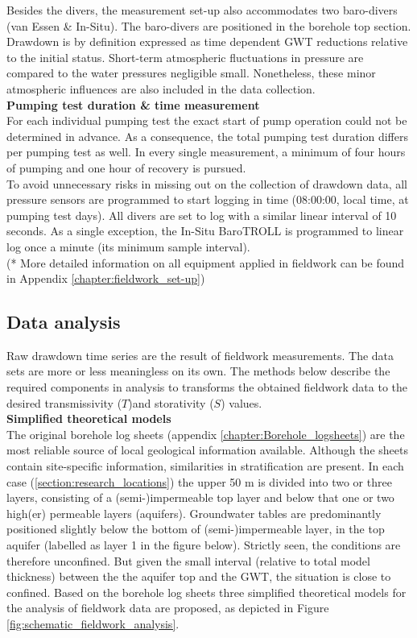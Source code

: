 Besides the divers, the measurement set-up also accommodates two baro-divers (van Essen \& In-Situ). The baro-divers are positioned in the borehole top section. Drawdown is by definition expressed as time dependent GWT reductions relative to the initial status. Short-term atmospheric fluctuations in pressure are compared to the water pressures negligible small. Nonetheless, these minor atmospheric influences are also included in the data collection. 
\bigskip \\
\textbf{Pumping test duration \& time measurement} \\
For each individual pumping test the exact start of pump operation could not be determined in advance. As a consequence, the total pumping test duration differs per pumping test as well. In every single measurement, a minimum of four hours of pumping and one hour of recovery is pursued. \\
To avoid unnecessary risks in missing out on the collection of drawdown data, all pressure sensors are programmed to start logging in time (08:00:00, local time, at pumping test days). All divers are set to log with a similar linear interval of 10 seconds. As a single exception, the In-Situ BaroTROLL is programmed to linear log once a minute (its minimum sample interval). \\

(* More detailed information on all equipment applied in fieldwork can be found in Appendix \ref{chapter:fieldwork_set-up}) 

\subsection{Data analysis}
\label{subsection:derivation_methods}
Raw drawdown time series are the result of fieldwork measurements. The data sets are more or less meaningless on its own. The methods below describe the required components in analysis to transforms the obtained fieldwork data to the desired transmissivity ($T$)and storativity ($S$) values. \\

\textbf{Simplified theoretical models} \\
The original borehole log sheets (appendix \ref{chapter:Borehole_logsheets}) are the most reliable source of local geological information available. Although the sheets contain site-specific information, similarities in stratification are present. In each case (\ref{section:research_locations}) the upper 50 m is divided into two or three layers, consisting of a (semi-)impermeable top layer and below that one or two high(er) permeable layers (aquifers). Groundwater tables are predominantly positioned slightly below the bottom of (semi-)impermeable layer, in the top aquifer (labelled as layer 1 in the figure below). Strictly seen, the conditions are therefore unconfined. But given the small interval (relative to total model thickness) between the the aquifer top and the GWT, the situation is close to confined. Based on the borehole log sheets three simplified theoretical models for the analysis of fieldwork data are proposed, as depicted in Figure \ref{fig:schematic_fieldwork_analysis}. 

